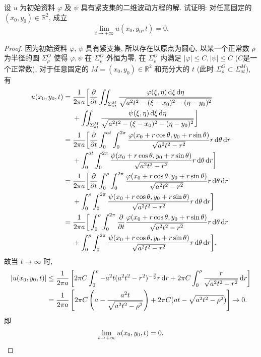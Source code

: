 \begin{exercise}
  设 $u$ 为初始资料 $\varphi$ 及 $\psi$ 具有紧支集的二维波动方程的解.
  试证明: 对任意固定的 $(x_0,y_0)\in \mathbb{R}^2$, 成立
  \[\lim_{t\to+\infty} u(x_0,y_0,t) = 0.\]
\end{exercise}

\begin{proof}
  因为初始资料 $\varphi$, $\psi$ 具有紧支集, 所以存在以原点为圆心,
  以某一个正常数 $\rho$ 为半径的圆 $\Sigma_{\rho}^O$ 
  使得 $\varphi,\psi$ 在 $\Sigma_{\rho}^O$ 外恒为零,
  在 $\Sigma_{\rho}^O$ 内满足 $|\varphi|\leq C,|\psi|\leq C$ ($C$是一个正常数),
  对于任意固定的 $M=(x_0,y_0)\in\mathbb{R}^2$
  和充分大的 $t$ (此时 $\Sigma_{\rho}^O\subset\Sigma_{at}^M$), 有
  \begin{align*}
    u(x_0,y_0,t) = {} 
    & \frac{1}{2\pi a}\biggl[\frac{\partial}{\partial t}
      \iint_{\Sigma_{at}^M}
      \frac{\varphi(\xi,\eta)\diff\xi\diff\eta}{\sqrt{a^2t^2-(\xi-x_0)^2-(\eta-y_0)^2}} \\
    & + \iint_{\Sigma_{at}^M}\frac{\psi(\xi,\eta)\diff\xi\diff\eta}
      {\sqrt{a^2t^2-(\xi-x_0)^2-(\eta-y_0)^2}}\biggr] \\
={} & \frac{1}{2\pi a}\bigg[\frac{\partial}{\partial t}\int_0^{at}\int_0^{2\pi}
      \frac{\varphi(x_0+r\cos\theta,y_0+r\sin\theta)}{\sqrt{a^2t^2-r^2}}r\diff\theta\diff r \\
    & +\int_0^{at}\int_0^{2\pi}\frac{\psi(x_0+r\cos\theta,y_0+r\sin\theta)}
      {\sqrt{a^2t^2-r^2}}r\diff\theta\diff r\bigg] \\
={} & \frac{1}{2\pi a}\bigg[\frac{\partial}{\partial t}
      \int_0^{\rho}\int_0^{2\pi}\frac{\varphi(x_0+r\cos\theta,y_0+r\sin\theta)}
      {\sqrt{a^2t^2-r^2}}r\diff\theta\diff r \\
    & + \int_0^{\rho}\int_0^{2\pi}\frac{\psi(x_0+r\cos\theta,y_0+r\sin\theta)}{\sqrt{a^2t^2-r^2}}r\diff\theta\diff r\bigg] \\
={} & \frac{1}{2\pi a}\bigg[\int_0^{\rho}\int_0^{2\pi}\frac{\partial}{\partial t}
      \frac{\varphi(x_0+r\cos\theta,y_0+r\sin\theta)}{\sqrt{a^2t^2-r^2}}r\diff\theta\diff r \\
    & + \int_0^{\rho}\int_0^{2\pi}\frac{\psi(x_0+r\cos\theta,y_0+r\sin\theta)}
      {\sqrt{a^2t^2-r^2}}r\diff\theta\diff r\bigg].
  \end{align*}
  故当 $t\to\infty$ 时,
  \[\begin{split}
  |u(x_0,y_0,t)|&\leq \frac{1}{2\pi a}\left[2\pi C\int_0^{\rho}-a^2t(a^2t^2-r^2)^{-\frac{3}{2}}r\mathop{}\!\mathrm{d} r+2\pi C\int_0^{\rho}\frac{r}{\sqrt{a^2t^2-r^2}}\mathop{}\!\mathrm{d} r\right]\\
  &=\frac{1}{2\pi a}\left[2\pi C\left(a-\frac{a^2t}{\sqrt{a^2t^2-\rho^2}}\right)+2\pi C(at-\sqrt{a^2t^2-\rho^2})\right]\to 0.
  \end{split}\]
  即
  \[\lim_{t\to+\infty}u(x_0,y_0,t) = 0.\qedhere\]
\end{proof}


